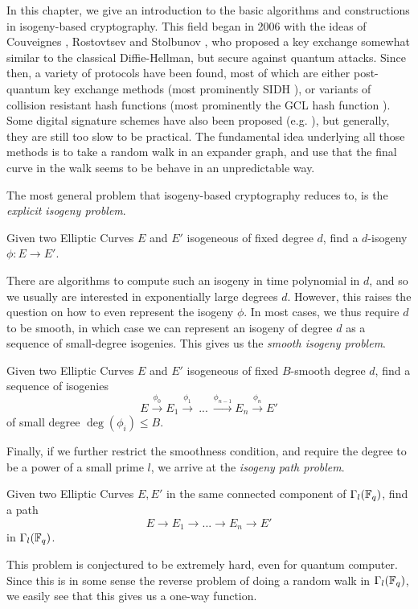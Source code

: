
In this chapter, we give an introduction to the basic algorithms and constructions in isogeny-based cryptography.
This field began in 2006 with the ideas of Couveignes \cite{old_isogeny_crypto1}, Rostovtsev and Stolbunov \cite{old_isogeny_crypto2, old_isogeny_crypto3}, who proposed a key exchange somewhat similar to the classical Diffie-Hellman, but secure against quantum attacks.
Since then, a variety of protocols have been found, most of which are either post-quantum key exchange methods (most prominently SIDH \cite{sidh}), or variants of collision resistant hash functions (most prominently the GCL hash function \cite{supersingular_hash_function}).
Some digital signature schemes have also been proposed (e.g. \cite{digital_signature}), but generally, they are still too slow to be practical. 
The fundamental idea underlying all those methods is to take a random walk in an expander graph, and use that the final curve in the walk seems to be behave in an unpredictable way.

The most general problem that isogeny-based cryptography reduces to, is the \emph{explicit isogeny problem}.
\begin{problem}
    Given two Elliptic Curves $E$ and $E'$ isogeneous of fixed degree $d$, find a $d$-isogeny $\phi: E \to E'$.
\end{problem}
There are algorithms to compute such an isogeny in time polynomial in $d$, and so we usually are interested in exponentially large degrees $d$.
However, this raises the question on how to even represent the isogeny $\phi$.
In most cases, we thus require $d$ to be smooth, in which case we can represent an isogeny of degree $d$ as a sequence of small-degree isogenies.
This gives us the \emph{smooth isogeny problem}.
\begin{problem}
    Given two Elliptic Curves $E$ and $E'$ isogeneous of fixed $B$-smooth degree $d$, find a sequence of isogenies
    \begin{equation*}
        E \overset{\phi_0}{\longrightarrow} E_1 \overset{\phi_1}{\longrightarrow} \ ... \ \overset{\phi_{n - 1}}{\longrightarrow} E_n \overset{\phi_n}{\longrightarrow} E'
    \end{equation*}
    of small degree $\deg(\phi_i) \leq B$.
\end{problem}
Finally, if we further restrict the smoothness condition, and require the degree to be a power of a small prime $l$, we arrive at the \emph{isogeny path problem}.
\begin{problem}
    Given two Elliptic Curves $E, E'$ in the same connected component of $\Gamma_l(\mathbb{F}_q)$, find a path
    \begin{equation*}
        E \to E_1 \to ... \to E_n \to E'
    \end{equation*}
    in $\Gamma_l(\mathbb{F}_q)$.
\end{problem}
This problem is conjectured to be extremely hard, even for quantum computer.
Since this is in some sense the reverse problem of doing a random walk in $\Gamma_l(\mathbb{F}_q)$, we easily see that this gives us a one-way function.

